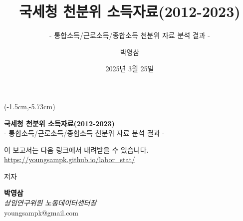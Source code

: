 \documentclass[
  a4paper,
  oneside,
  open=any]{scrbook}
\title{국세청 천분위 소득자료(2012-2023)}
\subtitle{- 통합소득/근로소득/종합소득 천분위 자료 분석 결과 -}
\author{박영삼}
\date{2025년 3월 25일}
\let\oldtextbf\textbf
\renewcommand{\textbf}[1]{\textcolor{black}{\oldtextbf{#1}}}
\begin{document}
  \begin{frontmatter}
  \begin{titlepage}

  \begin{minipage}[b][\textheight][s]{\textwidth}
  \raggedright


  \newfontfamily{}
  \begin{textblock*}{\textwidth}(-1.5cm,-5.73cm)  %
    {\kpubbold\large{}}
  \end{textblock*}

  {\Huge\bfseries{국세청 천분위 소득자료(2012-2023)}}\\[1\baselineskip]
  {\LARGE{- 통합소득/근로소득/종합소득 천분위 자료 분석 결과
  -}}\\[1\baselineskip]
    \vspace{3mm}

      이 보고서는 다음 링크에서 내려받을 수 있습니다.
      \url{https://youngsampk.github.io/labor_stat/}

  \begin{titlepagebox}



  \textcolor{anugold}{저자}
  \vspace{-3mm}
  \begin{multicols}{2}
      \begin{minipage}{\columnwidth}
      \raggedright
      \normalfont
      {\textbf{박영삼}}\\
          
      {\itshape{상임연구위원 \textbar{} 노동데이터센터장}}\\
           youngsampk@gmail.com\\
      
      
      \vspace{4mm}
      \end{minipage}


\end{multicols}
\end{titlepagebox}
\end{minipage}
\end{titlepage}
\end{frontmatter}
\end{document}
